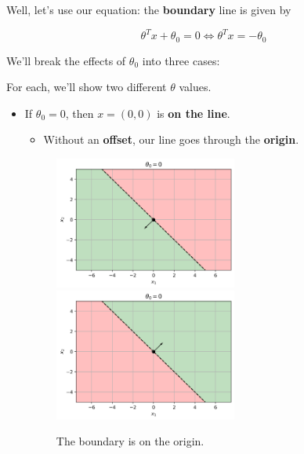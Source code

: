         Well, let's use our equation: the \textbf{boundary} line is given by 
        
        \begin{equation}
            \theta^T x + \theta_0 = 0 
            \Longleftrightarrow 
            \theta^T x = -\theta_0
        \end{equation}
        
        We'll break the effects of $\theta_0$ into three cases:
        
        For each, we'll show two different $\theta$ values.
        
        \begin{itemize}
            \item If $\theta_0=0$, then $x=(0,0)$ is \textbf{on the line}.
                \begin{itemize}
                    \item Without an \textbf{offset}, our line goes through the \textbf{origin}.
                \end{itemize}
                
                \begin{figure}[H]
                    \centering                         \includegraphics[width=60mm,scale=0.5]{images/classification_images/theta_0_zero.png}
                    \includegraphics[width=60mm,scale=0.5]{images/classification_images/zero_theta0_positive_theta.png}
                        \caption*{The boundary is on the origin.}
                \end{figure}
                

\end{itemize}
